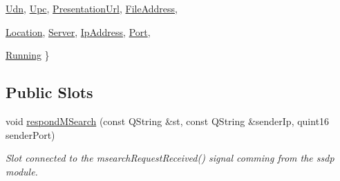 \begin{DoxyCompactItemize}
\hyperlink{classBrisaUpnp_1_1BrisaDevice_a4c9c16e6c1aa08b4e9ca5b81a26abca1a2668e5882bff5cf8d590c787ee0fa320}{Udn}, 
\hyperlink{classBrisaUpnp_1_1BrisaDevice_a4c9c16e6c1aa08b4e9ca5b81a26abca1a58f20da7d830c7ec323a8b33096f0363}{Upc}, 
\hyperlink{classBrisaUpnp_1_1BrisaDevice_a4c9c16e6c1aa08b4e9ca5b81a26abca1acddec53c0ff0eeabacba0864b4ebbd82}{PresentationUrl}, 
\hyperlink{classBrisaUpnp_1_1BrisaDevice_a4c9c16e6c1aa08b4e9ca5b81a26abca1af6f9103d7ad1aa0e5d5de59b451d975c}{FileAddress}, 
\par
\hyperlink{classBrisaUpnp_1_1BrisaDevice_a4c9c16e6c1aa08b4e9ca5b81a26abca1a77f32298db1081a1f39058046210621f}{Location}, 
\hyperlink{classBrisaUpnp_1_1BrisaDevice_a4c9c16e6c1aa08b4e9ca5b81a26abca1a9b90646b4c5d84db913d72a4ff628d32}{Server}, 
\hyperlink{classBrisaUpnp_1_1BrisaDevice_a4c9c16e6c1aa08b4e9ca5b81a26abca1aaf1ba3e90a04c8ad40fe996cf2cb9d53}{IpAddress}, 
\hyperlink{classBrisaUpnp_1_1BrisaDevice_a4c9c16e6c1aa08b4e9ca5b81a26abca1a02ca6c6bc5d713ba147d2d94b994b0db}{Port}, 
\par
\hyperlink{classBrisaUpnp_1_1BrisaDevice_a4c9c16e6c1aa08b4e9ca5b81a26abca1a24e94ba12e984af17242c65556e4c4d3}{Running}
 \}
\end{DoxyCompactItemize}
\subsection*{Public Slots}
\begin{DoxyCompactItemize}
\item 
void \hyperlink{classBrisaUpnp_1_1BrisaDevice_a2119be091ea48002b30a21e1b23f347c}{respondMSearch} (const QString \&st, const QString \&senderIp, quint16 senderPort)
\begin{DoxyCompactList}\small\item\em Slot connected to the msearchRequestReceived() signal comming from the ssdp module. \item\end{DoxyCompactList}\end{DoxyCompactItemize}

